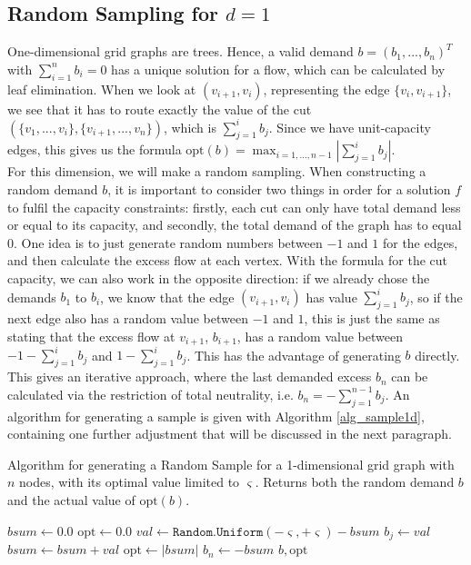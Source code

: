 \subsection{Random Sampling for $d=1$}
One-dimensional grid graphs are trees. Hence, a valid demand $b=(b_1,...,b_n)^T$ with $\sum_{i=1}^nb_i=0$ has a unique solution for a flow, which can be calculated by leaf elimination. When we look at $(v_{i+1},v_i)$, representing the edge $\{v_i,v_{i+1}\}$, we see that it has to route exactly the value of the cut $(\{v_1,...,v_i\},\{v_{i+1},...,v_n\})$, which is $\sum_{j=1}^ib_j$. Since we have unit-capacity edges, this gives us the formula $\text{opt}(b)=\max_{i=1,...,n-1}\left\vert\sum_{j=1}^ib_j\right\vert$.\\
For this dimension, we will make a random sampling. When constructing a random demand $b$, it is important to consider two things in order for a solution $f$ to fulfil the capacity constraints: firstly, each cut can only have total demand less or equal to its capacity, and secondly, the total demand of the graph has to equal $0$. One idea is to just generate random numbers between $-1$ and $1$ for the edges, and then calculate the excess flow at each vertex. With the formula for the cut capacity, we can also work in the opposite direction: if we already chose the demands $b_1$ to $b_i$, we know that the edge $(v_{i+1},v_i)$ has value $\sum_{j=1}^ib_j$, so if the next edge also has a random value between $-1$ and $1$, this is just the same as stating that the excess flow at $v_{i+1}$, $b_{i+1}$, has a random value between $-1-\sum_{j=1}^ib_j$ and $1-\sum_{j=1}^ib_j$. This has the advantage of generating $b$ directly. This gives an iterative approach, where the last demanded excess $b_n$ can be calculated via the restriction of total neutrality, i.e. $b_n=-\sum_{j=1}^{n-1}b_j$. An algorithm for generating a sample is given with Algorithm \ref{alg_sample1d}, containing one further adjustment that will be discussed in the next paragraph.\\
\begin{algorithm}
\caption{Algorithm for generating a Random Sample for a 1-dimensional grid graph with $n$ nodes, with its optimal value limited to $\varsigma$. Returns both the random demand $b$ and the actual value of $\text{opt}(b)$.}\label{alg_sample1d}
\begin{algorithmic}[1]
\State $bsum\gets 0.0$
\State $\text{opt}\gets 0.0$
    \State $val\gets \texttt{Random.Uniform}(-\varsigma,+\varsigma)-bsum$
    \State $b_j\gets val$
    \State $bsum\gets bsum+val$
        \State $\text{opt}\gets \vert bsum\vert$
    \EndIf
\EndFor
\State $b_n\gets -bsum$
\State \Return $b, \text{opt}$
\EndProcedure
\end{algorithmic}
\end{algorithm}
